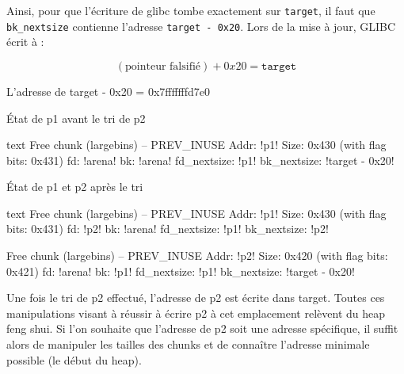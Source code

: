 Ainsi, pour que l’écriture de glibc tombe exactement sur \texttt{target}, il faut que \texttt{bk\_nextsize} contienne l’adresse \texttt{target - 0x20}.
Lors de la mise à jour, GLIBC écrit à :


\[
    (\text{pointeur falsifié}) + 0x20 = \texttt{target}
\]


L'adresse de target - 0x20 = \textcolor{pwndbgbrown}{0x7fffffffd7e0}


État de p1 avant le tri de p2
\begin{pwndbg}[heap]{text}
    Free chunk (largebins) -- PREV_INUSE
    Addr: !\textcolor{pwndbgred}{p1}!
    Size: 0x430 (with flag bits: 0x431)
    fd: !\textcolor{pwndbgpurple}{arena}!
    bk: !\textcolor{pwndbgpurple}{arena}!
    fd_nextsize: !\textcolor{pwndbgred}{p1}!
    bk_nextsize: !\textcolor{pwndbgbrown}{target - 0x20}!
\end{pwndbg}

État de p1 et p2 après le tri
\begin{pwndbg}[heap]{text}
    Free chunk (largebins) -- PREV_INUSE
    Addr: !\textcolor{pwndbgred}{p1}!
    Size: 0x430 (with flag bits: 0x431)
    fd: !\textcolor{pwndbgblue}{p2}!
    bk: !\textcolor{pwndbgpurple}{arena}!
    fd_nextsize: !\textcolor{pwndbgred}{p1}!
    bk_nextsize: !\textcolor{pwndbgblue}{p2}!


    Free chunk (largebins) -- PREV_INUSE
    Addr: !\textcolor{pwndbgblue}{p2}!
    Size: 0x420 (with flag bits: 0x421)
    fd: !\textcolor{pwndbgpurple}{arena}!
    bk: !\textcolor{pwndbgred}{p1}!
    fd_nextsize: !\textcolor{pwndbgred}{p1}!
    bk_nextsize: !\textcolor{pwndbgbrown}{target - 0x20}!
\end{pwndbg}


Une fois le tri de p2 effectué, l’adresse de p2 est écrite dans target.
Toutes ces manipulations visant à réussir à écrire p2 à cet emplacement
relèvent du heap feng shui.
Si l’on souhaite que l’adresse de p2 soit une adresse spécifique,
il suffit alors de manipuler les tailles des chunks et de connaître
l’adresse minimale possible (le début du heap).


